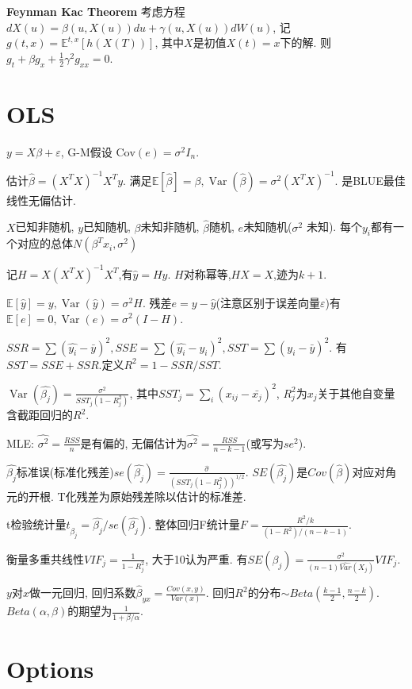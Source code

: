 \documentclass[UTF8]{ctexart}
\begin{document}
\textbf{Feynman Kac Theorem}
考虑方程 $dX(u)=\beta(u,X(u))du+\gamma(u,X(u))dW(u)$, 
记$g(t,x)=\mathbb{E}^{t,x}[h(X(T))]$, 其中$X$是初值$X(t)=x$下的解.
则$g_t+\beta g_x+\frac12 \gamma^2 g_{xx}=0$.

\section{OLS}
$y=X\beta+\varepsilon$, G-M假设 $\text{Cov}(e)=\sigma ^2 I_n$.

估计$\hat{\beta}=(X^TX)^{-1}X^Ty$.
满足$\mathbb{E}[\hat{\beta}]=\beta, \operatorname{Var}(\hat{\beta})=\sigma^2(X^TX)^{-1}$.
是BLUE最佳线性无偏估计.

$X$已知非随机, $y$已知随机, $\beta$未知非随机, $\hat{\beta}$随机, $e$未知随机($\sigma^2$ 未知).
每个$y_i$都有一个对应的总体$N(\beta^T x_i, \sigma^2)$

记$H=X(X^TX)^{-1}X^T$,有$\hat{y}=Hy$. $H$对称幂等,$HX=X$,迹为$k+1$.

$\mathbb{E}[\hat{y}]=y, \operatorname{Var}(\hat{y})=\sigma^2H$.
残差$e=y-\hat{y}$(注意区别于误差向量$\varepsilon$)有
$\mathbb{E}[e]=0, \operatorname{Var}(e)=\sigma^2 (I-H)$.

$SSR = \sum (\hat{y_i}-\bar{y})^2, SSE = \sum (\hat{y_i}-y_i)^2, SST = \sum (y_i-\bar{y})^2$.
有$SST=SSE+SSR$.定义$R^2=1-SSR/SST$.

$\operatorname{Var}(\hat{\beta_j}) = \frac{\sigma^2}{SST_j(1-R_j^2)}$,
其中$SST_j=\sum_i (x_{ij}-\bar{x_j})^2$, $R_j^2$为$x_j$关于其他自变量含截距回归的$R^2$.

MLE: $\hat{\sigma^2}=\frac{RSS}{n}$是有偏的, 
无偏估计为$\hat{\sigma^2}=\frac{RSS}{n-k-1}$(或写为$se^2$).

$\hat{\beta_j}$标准误(标准化残差)$se(\hat{\beta_j}) = \frac{\hat{\sigma}}{(SST_j(1-R_j^2))^{1/2}}$.
$SE(\hat{\beta_j})$是$Cov(\hat{\beta})$对应对角元的开根.
T化残差为原始残差除以估计的标准差.


t检验统计量$t_{\hat{\beta_j}} = \hat{\beta_j}/se(\hat{\beta_j})$.
整体回归F统计量$F=\frac{R^2/k}{(1-R^2)/(n-k-1)}$.

衡量多重共线性$VIF_j = \frac{1}{1-R_j^2}$, 大于10认为严重.
有$SE(\beta_j)=\frac{\sigma^2}{(n-1)\hat{Var}(X_j)}VIF_j$.

$y$对$x$做一元回归, 回归系数$\hat{\beta}_{yx}=\frac{Cov(x,y)}{Var(x)}$. 回归$R^2$的分布$\sim Beta(\frac{k-1}{2},\frac{n-k}{2})$. $Beta(\alpha,\beta)$的期望为$\frac{1}{1+\beta/\alpha}$.


\section{Options}
\end{document}

